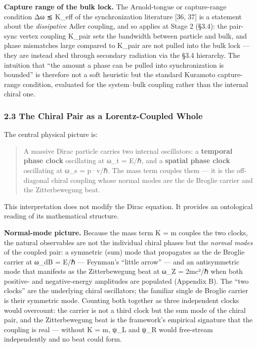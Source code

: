 \documentclass[
]{article}
\begin{document}
\textbf{Capture range of the bulk lock.} The Arnold-tongue or
capture-range condition \textbar Δω\textbar{} ≲ K\_eff of the
synchronization literature {[}36, 37{]} is a statement about the
\emph{dissipative} Adler coupling, and so applies at Stage 2 (§3.4): the
pair-sync vertex coupling K\_pair sets the bandwidth between particle
and bulk, and phase mismatches large compared to K\_pair are not pulled
into the bulk lock --- they are instead shed through secondary radiation
via the §3.4 hierarchy. The intuition that ``the amount a phase can be
pulled into synchronization is bounded'' is therefore not a soft
heuristic but the standard Kuramoto capture-range condition, evaluated
for the system--bulk coupling rather than the internal chiral one.

\subsubsection{2.3 The Chiral Pair as a Lorentz-Coupled
Whole}\label{the-chiral-pair-as-a-lorentz-coupled-whole}

The central physical picture is:

\begin{quote}
A massive Dirac particle carries two internal oscillators: a
\textbf{temporal phase clock} oscillating at ω\_t = E/ℏ, and a
\textbf{spatial phase clock} oscillating at ω\_s = p·v/ℏ. The mass term
couples them --- it is the off-diagonal chiral coupling whose normal
modes are the de Broglie carrier and the Zitterbewegung beat.
\end{quote}

This interpretation does not modify the Dirac equation. It provides an
ontological reading of its mathematical structure.

\textbf{Normal-mode picture.} Because the mass term K = m couples the
two clocks, the natural observables are not the individual chiral phases
but the \emph{normal modes} of the coupled pair: a symmetric (sum) mode
that propagates as the de Broglie carrier at ω\_dB = E/ℏ --- Feynman's
``little arrow'' --- and an antisymmetric mode that manifests as the
Zitterbewegung beat at ω\_Z = 2mc²/ℏ when both positive- and
negative-energy amplitudes are populated (Appendix B). The ``two
clocks'' are the underlying chiral oscillators; the familiar single de
Broglie carrier is their symmetric mode. Counting both together as three
independent clocks would overcount: the carrier is not a third clock but
the sum mode of the chiral pair, and the Zitterbewegung beat is the
framework's empirical signature that the coupling is real --- without K
= m, ψ\_L and ψ\_R would free-stream independently and no beat could
form.
\end{document}

